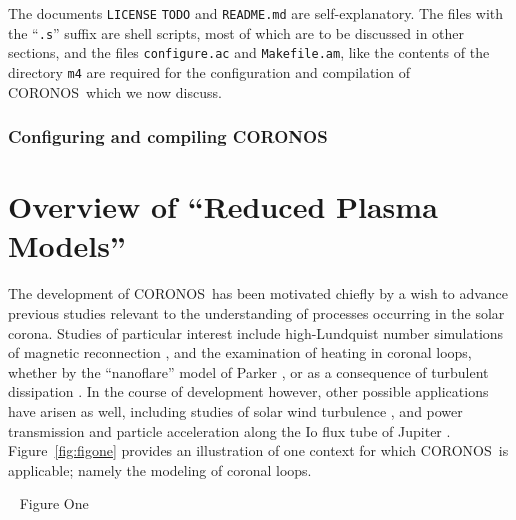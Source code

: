 \documentclass[12pt, letterpaper, oneside, leqno, openright]{memoir}
\newcommand{\coronos}{\textsf{CORONOS}}
\begin{document}
%
%
The documents \texttt{LICENSE} \texttt{TODO} and 
\texttt{README.md} are self-explanatory. The files with the
``\texttt{.s}'' suffix are shell scripts, most of which are
to be discussed in other sections, and the files
\texttt{configure.ac} and \texttt{Makefile.am}, like the contents
of the directory \texttt{m4} are required for the configuration
and compilation of \coronos\ which we now discuss.
%
\par
%
\subsection{Configuring and compiling \coronos\ }
\label{sec:concom}
%
\chapter{Overview of ``Reduced Plasma Models''}
\label{sec:overview}
%
The development of \coronos\ has been motivated chiefly by a wish to advance
previous studies relevant to the understanding of processes occurring in the
solar corona. Studies of particular interest include high-Lundquist number
simulations of magnetic reconnection \citep{NgRagunathan2011, Tassietal2010},
and the examination of heating in coronal loops, whether by the ``nanoflare''
model of Parker \citep{Ngetal2012}, or as a consequence of turbulent
dissipation \citep{Ngetal2017}. In the course of development however, other
possible applications have arisen as well, including studies of solar wind
turbulence \citep{PerezChandran2013}, and power transmission and particle
acceleration along the Io flux tube of Jupiter \citep{Hessetal2010}.
Figure~\ref{fig:figone} provides an illustration of one context for which
\coronos\ is applicable; namely the modeling of coronal loops.

 ~ Figure One ~~~~~~~~~~~~~~~~~~~~~~~~~~~~~~~~~~~~~~~~~~~~~~~~~~~~~~~~~~~~~~ %
\end{document}
